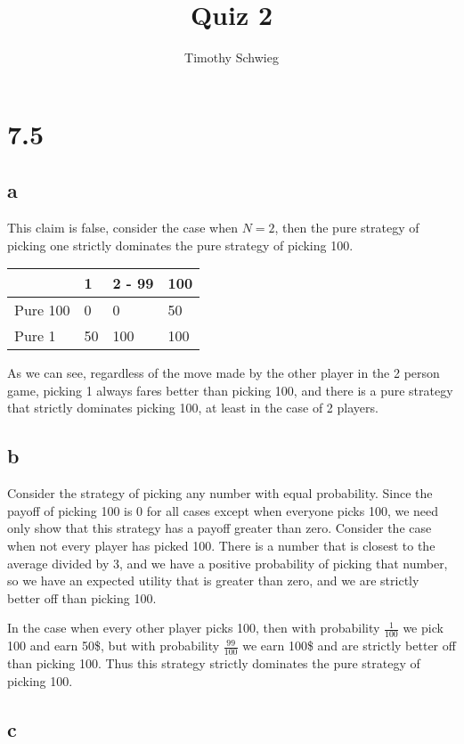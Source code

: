 \documentclass[10pt]{paper}
\title{Quiz 2}
\author{Timothy Schwieg}
\begin{document}
\maketitle

\section*{7.5}

\subsection*{a}

This claim is false, consider the case when $N = 2$, then the pure
strategy of picking one strictly dominates the pure strategy of
picking 100.

\begin{tabular*}{1.0\linewidth}{l|l|l|l}
  & 1 & 2 - 99 & 100\\\hline
  Pure 100 & 0 & 0 & 50\\
  Pure 1 & 50 & 100 & 100\\
\end{tabular*}


As we can see, regardless of the move made by the other player in the
2 person game, picking 1 always fares better than picking 100, and
there is a pure strategy that strictly dominates picking 100, at least
in the case of 2 players.

\subsection*{b}

Consider the strategy of picking any number with equal
probability. Since the payoff of picking 100 is 0 for all cases except
when everyone picks 100, we need only show that this strategy has a
payoff greater than zero. Consider the case when not every player has
picked 100. There is a number that is closest to the average divided
by 3, and we have a positive probability of picking that number, so we
have an expected utility that is greater than zero, and we are
strictly better off than picking 100. 

In the case when every other player picks 100, then with probability
$\frac{1}{100}$ we pick 100 and earn 50\$, but with probability
$\frac{99}{100}$ we earn 100\$ and are strictly better off than
picking 100. Thus this strategy strictly dominates the pure strategy
of picking 100.

\subsection*{c}
\end{document}
